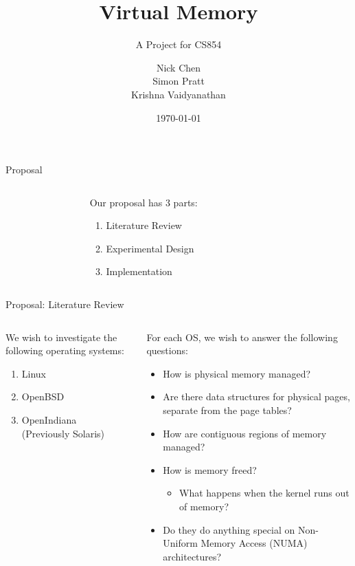 \documentclass[aspectratio=169]{beamer}
\title{Virtual Memory}
\subtitle{A Project for CS854}
\author[N. Chen, S. Pratt, K. Vaidyanathan]{Nick Chen\\Simon Pratt\\%
Krishna Vaidyanathan}
\date{\today}
\newcommand{\bi}{\begin{itemize}}
\newcommand{\ei}{\end{itemize}}
\newcommand{\bn}{\begin{enumerate}}
\newcommand{\en}{\end{enumerate}}
\begin{document}
\frame[plain]{\titlepage}

\begin{frame}{Proposal}
  \begin{columns}[T]
    \begin{column}{0.2\textwidth}
    \end{column}
    \begin{column}{0.6\textwidth}
      Our proposal has 3 parts:
      \bn
      \pause
    \item { Literature Review}
      \pause
    \item Experimental Design
      \pause
    \item Implementation
      \en
    \end{column}
    \begin{column}{0.2\textwidth}
    \end{column}
  \end{columns}
\end{frame}

\begin{frame}{Proposal: Literature Review}
  \begin{columns}[T]
    \begin{column}{0.4\textwidth}
      We wish to investigate the following operating systems:
      \bn
      \pause
    \item Linux
      \pause
    \item OpenBSD
      \pause
    \item OpenIndiana\\(Previously Solaris)
      \en
    \end{column}
    \begin{column}{0.6\textwidth}
      \pause
    For each OS, we wish to answer the following questions:
    \bi
    \pause
  \item How is physical memory managed?
    \pause
  \item Are there data structures for physical pages, separate from
    the page tables?
    \pause
  \item How are contiguous regions of memory managed?
    \pause
  \item How is memory freed?
    \pause
    \bi
  \item What happens when the kernel runs out of memory?
    \ei
    \pause
  \item Do they do anything special on Non-Uniform Memory Access
    (NUMA) architectures?
    \ei
    \end{column}
  \end{columns}
\end{frame}
\end{document}

